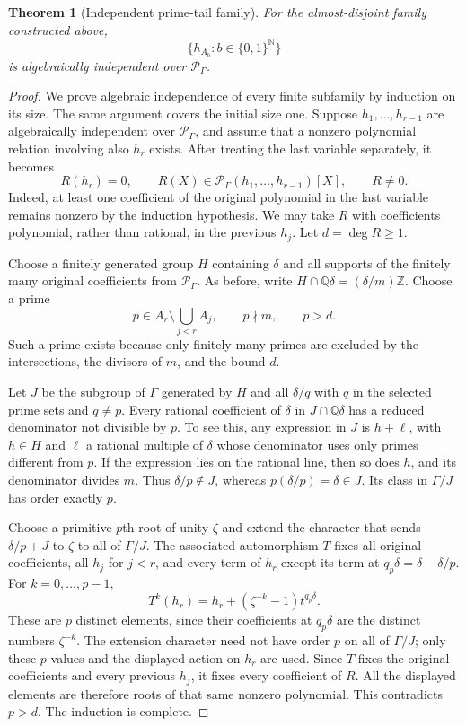 \documentclass[11pt,oneside]{article}
\newtheorem{theorem}{Theorem}[section]
\theoremstyle{definition}
\theoremstyle{remark}
\newcommand{\Q}{\mathbb Q}
\newcommand{\Z}{\mathbb Z}
\newcommand{\N}{\mathbb N}
\newcommand{\Pfield}{\mathscr P_\Gamma}
\begin{document}
\begin{theorem}[Independent prime-tail family]\label{hnd:thm:independence}
For the almost-disjoint family constructed above,
\[
 \{h_{A_b}:b\in\{0,1\}^{\N}\}
\]
is algebraically independent over $\Pfield$.
\end{theorem}
\begin{proof}
We prove algebraic independence of every finite subfamily by induction
on its size. The same argument covers the initial size one.
Suppose $h_1,\ldots,h_{r-1}$ are algebraically independent over
$\Pfield$, and assume that a nonzero polynomial relation involving also
$h_r$ exists. After treating the last variable separately, it becomes
\begin{equation}\label{hnd:eq:relation}
 R(h_r)=0,
 \qquad
 R(X)\in\Pfield(h_1,\ldots,h_{r-1})[X],
 \qquad R\ne0.
\end{equation}
Indeed, at least one coefficient of the original polynomial in the last
variable remains nonzero by the induction hypothesis. We may take $R$
with coefficients polynomial, rather than rational, in the previous
$h_j$. Let $d=\deg R\ge1$.

Choose a finitely generated group $H$ containing $\delta$ and all
supports of the finitely many original coefficients from $\Pfield$.
As before, write $H\cap\Q\delta=(\delta/m)\Z$.
Choose a prime
\[
 p\in A_r\setminus\bigcup_{j<r}A_j,
 \qquad p\nmid m,
 \qquad p>d.
\]
Such a prime exists because only finitely many primes are excluded by
the intersections, the divisors of $m$, and the bound $d$.

Let $J$ be the subgroup of $\Gamma$ generated by $H$ and all
$\delta/q$ with $q$ in the selected prime sets and $q\ne p$.
Every rational coefficient of $\delta$ in $J\cap\Q\delta$ has a
reduced denominator not divisible by $p$. To see this, any expression
in $J$ is $h+\ell$, with $h\in H$ and $\ell$ a rational multiple of
$\delta$ whose denominator uses only primes different from $p$.
If the expression lies on the rational line, then so does $h$, and its
denominator divides $m$. Thus $\delta/p\notin J$, whereas
$p(\delta/p)=\delta\in J$. Its class in $\Gamma/J$ has order exactly
$p$.

Choose a primitive $p$th root of unity $\zeta$ and extend the character
that sends $\delta/p+J$ to $\zeta$ to all of $\Gamma/J$.
The associated automorphism $T$ fixes all original coefficients, all
$h_j$ for $j<r$, and every term of $h_r$ except its term at
$q_p\delta=\delta-\delta/p$.
For $k=0,\ldots,p-1$,
\begin{equation}\label{hnd:eq:orbit-tail}
 T^k(h_r)=h_r+(\zeta^{-k}-1)t^{q_p\delta}.
\end{equation}
These are $p$ distinct elements, since their coefficients at
$q_p\delta$ are the distinct numbers $\zeta^{-k}$. The extension
character need not have order $p$ on all of $\Gamma/J$; only these
$p$ values and the displayed action on $h_r$ are used.
Since $T$ fixes the original coefficients and every previous $h_j$,
it fixes every coefficient of $R$. All the displayed elements are
therefore roots of that same nonzero polynomial. This contradicts
$p>d$. The induction is complete.
\end{proof}
\end{document}
